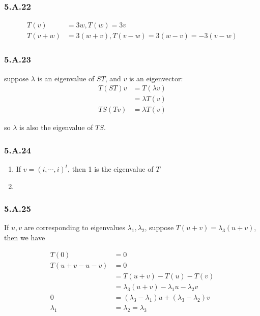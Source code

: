 \subsubsection*{5.A.22}

\begin{equation*}
    \begin{split}
    T(v) &= 3w, T(w) = 3v \\
    T(v + w) &= 3(w+v), T(v - w) = 3(w-v) = -3(v-w)
\end{split}
\end{equation*}

\subsubsection*{5.A.23}

suppose $\lambda$ is an eigenvalue of $ST$, and $v$ is an eigenvector:
\begin{equation*}
    \begin{split}
    T(ST)v &= T(\lambda v) \\
    & = \lambda T(v) \\
    TS(Tv) &= \lambda T(v)
\end{split}
\end{equation*}

so $\lambda$ is also the eigenvalue of $TS$.

\subsubsection*{5.A.24}

\begin{enumerate}[label=(\alph*)]
\item If $v = (i,\cdots, i)^{t}$, then 1 is the eigenvalue of $T$
\item 
\end{enumerate}

\subsubsection*{5.A.25}

If $u, v$ are corresponding to eigenvalues $\lambda_{1}, \lambda_{2}$, suppose $T(u+v) = \lambda_{3}(u+v)$, then we have

\begin{equation*}
    \begin{split}
    T(0) &= 0 \\
    T(u+v - u - v) & = 0\\
    &= T(u+v) - T(u) - T(v) \\
    &= \lambda_{3}(u+v) - \lambda_{1}u - \lambda_{2} v \\
    0 &= (\lambda_{3} - \lambda_{1})u + (\lambda_{3} - \lambda_{2}) v \\
    \lambda_{1} &= \lambda_{2} = \lambda_{3}
\end{split}
\end{equation*}

